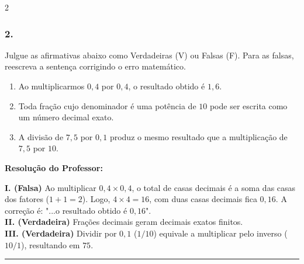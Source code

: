 \begin{multicols*}{2}
\subsubsection*{2.} Julgue as afirmativas abaixo como Verdadeiras (V) ou Falsas (F). Para as falsas, reescreva a sentença corrigindo o erro matemático.
\begin{enumerate}[label=\Roman*., itemsep=\espacoAlt]
    \item Ao multiplicarmos $ 0,4 $ por $ 0,4 $, o resultado obtido é $ 1,6 $.
    \item Toda fração cujo denominador é uma potência de $ 10 $ pode ser escrita como um número decimal exato.
    \item A divisão de $ 7,5 $ por $ 0,1 $ produz o mesmo resultado que a multiplicação de $ 7,5 $ por $ 10 $.
\end{enumerate}

\ifgabarito
    \begin{tcolorbox}[colback=CorTitUm!5, colframe=CorTitUm, boxrule=1pt, arc=4pt, left=6pt, right=6pt, top=6pt, bottom=6pt]
    \small\textbf{\textcolor{CorTitUm}{Resolução do Professor:}}\par\vspace{0.1cm}
    \color{CinzaEscuro}
    \textbf{I. (Falsa)} Ao multiplicar $ 0,4 \times 0,4 $, o total de casas decimais é a soma das casas dos fatores ($1+1=2$). Logo, $ 4 \times 4 = 16 $, com duas casas decimais fica $ 0,16 $. A correção é: "...o resultado obtido é $ 0,16 $".\\
    \textbf{II. (Verdadeira)} Frações decimais geram decimais exatos finitos.\\
    \textbf{III. (Verdadeira)} Dividir por $ 0,1 $ ($1/10$) equivale a multiplicar pelo inverso ($10/1$), resultando em $ 75 $.
    \end{tcolorbox}
\fi

\par\vspace{\espacoQuestao}

\noindent\textcolor{CorLinha}{\rule{\linewidth}{0.5pt}} 
\par\vspace{\espacoPreQuestao}

\end{multicols*}
